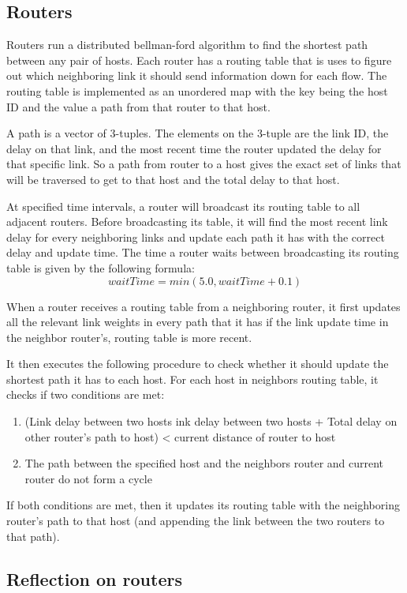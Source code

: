 \documentclass[12pt]{article}
\begin{document}
\subsection{Routers}

Routers run a distributed bellman-ford algorithm to find the shortest path between any pair of hosts. Each router has a routing table that is uses to figure out which neighboring link it should send information down for each flow. The routing table is implemented as an unordered map with the key being the host ID and the value a path from that router to that host.
 
A path is a vector of 3-tuples. The elements on the 3-tuple are the link ID, the delay on that link, and the most recent time the router updated the delay for that specific link. So a path from router to a host gives the exact set of links that will be traversed to get to that host and the total delay to that host.
 
At specified time intervals, a router will broadcast its routing table to all adjacent routers. Before broadcasting its table, it will find the most recent link delay for every neighboring links and update each path it has with the correct delay and update time. The time a router waits between broadcasting its routing table is given by the following formula: 
$$waitTime = min(5.0, waitTime + 0.1)$$

When a router receives a routing table from a neighboring router, it first updates all the relevant link weights in every path that it has if the link update time in the neighbor router’s, routing table is more recent.

It then executes the following procedure to check whether it should update the shortest path it has to each host. For each host in neighbors routing table, it checks if two conditions are met:
\begin{enumerate}
\item (Link delay between two hosts ink delay between two hosts + Total delay on other router’s path to host) < current distance of router to host
\item The path between the specified host and the neighbors router and current router do not form a cycle
\end{enumerate}
If both conditions are met, then it updates its routing table with the neighboring router’s path to that host (and appending the link between the two routers to that path).


\subsection*{Reflection on routers}
 
\end{document}
